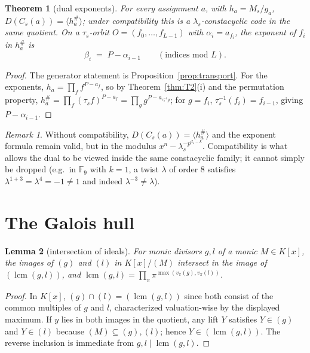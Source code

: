 \documentclass[10pt,journal,draftclsnofoot,onecolumn]{IEEEtran}
\newtheorem{theorem}{Theorem}[section]
\newtheorem{lemma}[theorem]{Lemma}
\theoremstyle{definition}
\theoremstyle{remark}
\newtheorem*{remark}{Remark}
\newcommand{\lcm}{\operatorname{lcm}}
\begin{document}
\begin{theorem}[dual exponents]\label{thm:T3}
For every assignment \(a\), with \(h_a = M_s / g_a\),
\(D(C_s(a)) = \langle h_a^{\#} \rangle\); under compatibility this is a
\(\lambda_s\)-constacyclic code in the same quotient. On a
\(\tau_s\)-orbit \(O = (f_0,\dots,f_{L-1})\) with \(\alpha_i = a_{f_i}\),
the exponent of \(f_i\) in \(h_a^{\#}\) is
\[
\beta_i \;=\; P - \alpha_{i-1} \qquad (\text{indices mod } L).
\]
\end{theorem}

\begin{proof}
The generator statement is Proposition~\ref{prop:transport}. For the
exponents, \(h_a = \prod_{f} f^{P - a_f}\), so by Theorem~\ref{thm:T2}(i)
and the permutation property,
\(h_a^{\#} = \prod_f (\tau_s f)^{P-a_f} = \prod_{g} g^{P - a_{\tau_s^{-1} g}}\);
for \(g = f_i\), \(\tau_s^{-1}(f_i) = f_{i-1}\), giving \(P - \alpha_{i-1}\).
\end{proof}

\begin{remark}
Without compatibility, \(D(C_s(a)) = \langle h_a^{\#}\rangle\) and the
exponent formula remain valid, but in the modulus
\(x^n - \lambda_s^{-p^{d_s-k}}\). Compatibility is what allows the dual
to be viewed inside the same constacyclic family; it cannot simply be
dropped (e.g.\ in \(\mathbb{F}_9\) with \(k=1\), a twist \(\lambda\) of
order \(8\) satisfies \(\lambda^{1+3} = \lambda^4 = -1 \ne 1\) and indeed
\(\lambda^{-3} \ne \lambda\)).
\end{remark}

\section{The Galois hull}\label{sec:hull}

\begin{lemma}[intersection of ideals]\label{lem:lcm}
For monic divisors \(g, l\) of a monic \(M \in K[x]\), the images of
\((g)\) and \((l)\) in \(K[x]/(M)\) intersect in the image of
\((\lcm(g,l))\), and
\(\lcm(g,l) = \prod_{\pi} \pi^{\max(v_\pi(g), v_\pi(l))}\).
\end{lemma}

\begin{proof}
In \(K[x]\), \((g) \cap (l) = (\lcm(g,l))\) since both consist of the
common multiples of \(g\) and \(l\), characterized valuation-wise by the
displayed maximum. If \(y\) lies in both images in the quotient, any
lift \(Y\) satisfies \(Y \in (g)\) and \(Y \in (l)\) because
\((M) \subseteq (g), (l)\); hence \(Y \in (\lcm(g,l))\). The reverse
inclusion is immediate from \(g, l \mid \lcm(g,l)\).
\end{proof}
\end{document}
